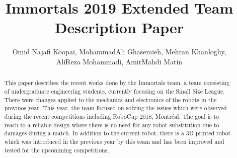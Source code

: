 \documentclass[runningheads,a4paper]{llncs}
\title{Immortals 2019 Extended Team Description Paper}
\author{\normalsize Omid Najafi Koopai{\textsupsub{\small\texttt{1}}{}}, 
MohammadAli Ghasemieh{\textsupsub{\small\texttt{2}}{}}, 
Mehran Khanloghy{\textsupsub{\small\texttt{3}}{}}, \\
\normalsize AliReza Mohammadi{\textsupsub{\small\texttt{3}}{}}, 
AmirMahdi Matin{\textsupsub{\small\texttt{3}}{}}
}
\institute{Sharif University of Technology, \\
\texttt{http://devoted-web-site.url}}
\begin{document}
\maketitle


%
%

\begin{abstract}
This paper describes the recent works done by the Immortals team, a team consisting of undergraduate engineering students, currently focusing on the Small Size League. There were changes applied to the mechanics and electronics of the robots in the previuos year. This year, the team focused on solving the issues which were observed during the recent competitions including RoboCup 2018, Montréal. The goal is to reach to a reliable design where there is no need for any robot substitution due to damages during a match. In addition to the current robot, there is a 3D printed robot which was introduced in the previous year by this team and has been improved and tested for the upcomming competitions.

\end{abstract}


\justify
\end{document}
